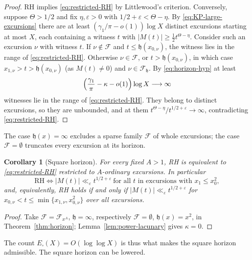 \documentclass[11pt]{amsart}
\numberwithin{equation}{section}
\theoremstyle{plain}
\newtheorem{corollary}[theorem]{Corollary}
\theoremstyle{definition}
\theoremstyle{remark}
\newcommand{\eps}{\varepsilon}
\newcommand{\F}{\mathcal{F}}
\begin{document}
\begin{proof}
RH implies \eqref{eq:restricted-RH} by Littlewood's criterion. Conversely,
suppose $\Theta>1/2$ and fix $\eta,\eps>0$ with
$1/2+\eps<\Theta-\eta$. By \eqref{eq:KP-large-excursions} there are at least
$(\gamma_1/\pi-o(1))\log X$ distinct excursions starting at most $X$, each
containing a witness $t$ with $|M(t)|\ge\frac12t^{\Theta-\eta}$. Consider
such an excursion $\nu$ with witness $t$. If $\nu\notin\F$ and
$t\le \mathfrak h(x_{0,\nu})$, the witness lies in the range of
\eqref{eq:restricted-RH}. Otherwise $\nu\in\F$, or $t>\mathfrak h(x_{0,\nu})$, in
which case $x_{1,\nu}>t>\mathfrak h(x_{0,\nu})$ (as $M(t)\ne0$) and $\nu\in\F_{\mathfrak h}$. By
\eqref{eq:horizon-hyp} at least
\[
\Bigl(\frac{\gamma_1}{\pi}-\kappa-o(1)\Bigr)\log X\longrightarrow\infty
\]
witnesses lie in the range of \eqref{eq:restricted-RH}. They belong to
distinct excursions, so they are unbounded, and at them
$t^{\Theta-\eta}/t^{1/2+\eps}\to\infty$, contradicting
\eqref{eq:restricted-RH}.
\end{proof}

The case $\mathfrak h(x)=\infty$ excludes a sparse family $\F$ of whole excursions;
the case $\F=\emptyset$ truncates every excursion at its horizon.

\begin{corollary}[Square horizon]
\label{cor:power-ordinary-RH}
\label{cor:square-truncated-RH}
For every fixed $A>1$, RH is equivalent to \eqref{eq:restricted-RH}
restricted to $A$-ordinary excursions. In particular
\begin{equation}
\label{eq:square-horizon-RH}
\boxed{\ \mathrm{RH}\iff
|M(t)|\ll_\eps t^{1/2+\eps}
\ \text{for all $t$ in excursions with }x_1\le x_0^2,\ }
\end{equation}
and, equivalently, RH holds if and only if
$|M(t)|\ll_\eps t^{1/2+\eps}$ for $x_{0,\nu}<t\le\min\{x_{1,\nu},x_{0,\nu}^2\}$
over all excursions.
\end{corollary}

\begin{proof}
Take $\F=\F_{x^A}$, $\mathfrak h=\infty$, respectively $\F=\emptyset$, $\mathfrak h(x)=x^2$, in
Theorem~\ref{thm:horizon}; Lemma~\ref{lem:power-lacunary} gives
$\kappa=0$.
\end{proof}

The count $E_\square(X)=O(\log\log X)$ is thus what makes the square
horizon admissible. The square horizon can be lowered.
\end{document}
